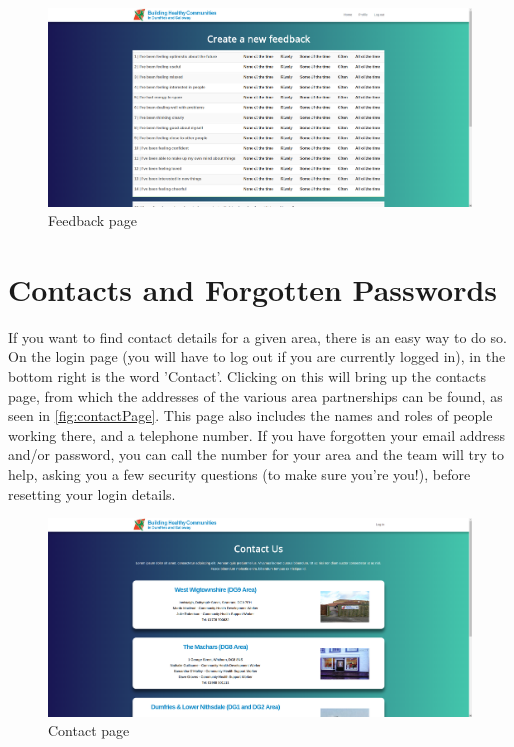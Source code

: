 \documentclass{bhcguides}
\begin{document}
\begin{figure}[h]
 \centerline{\includegraphics[width=\textwidth, height=\textheight, keepaspectratio]{feedbackpage.png}}
 \caption{Feedback page}
 \label{fig:feedbackPage}
\end{figure}

\pagebreak

\section{Contacts and Forgotten Passwords}
\label{sec:contacts}

If you want to find contact details for a given area, there is an easy way to do so. On the login page (you will have to log out if you are currently logged in), in the bottom right is the word 'Contact'. Clicking on this will bring up the contacts page, from which the addresses of the various area partnerships can be found, as seen in \autoref{fig:contactPage}. This page also includes the names and roles of people working there, and a telephone number. If you have forgotten your email address and/or password, you can call the number for your area and the team will try to help, asking you a few security questions (to make sure you're you!), before resetting your login details.

\begin{figure}[h]
 \centerline{\includegraphics[width=\textwidth, height=\textheight, keepaspectratio]{contactpage.png}}
 \caption{Contact page}
 \label{fig:contactPage}
\end{figure}
\end{document}
